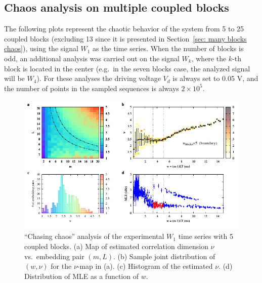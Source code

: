 \begin{appendices}
\chapter{Chaos analysis on multiple coupled blocks}\label{app: multiple blocks}

The following plots represent the chaotic behavior of the system from 5 to 25 coupled blocks
(excluding 13 since it is presented in Section~\ref{sec: many blocks chaos}),
using the signal $W_1$ as the time series.
When the number of blocks is odd, an additional analysis was carried out on the signal $W_k$, where
the $k$-th block is located in the center (e.g.\ in the seven blocks case,
the analyzed signal will be $W_4$).
For these analyses the driving voltage $V_d$ is always set to 0.05 V, and the number of points
in the sampled sequences is always $2\times 10^5$.

\begin{figure}[!htbp]
    \centering
    \includegraphics[width=\linewidth]{../blocks/5_blocks/edge/2e5_points/plots/chaos_low.pdf}
    \caption{``Chasing chaos'' analysis of the experimental $W_1$ time series with 5 coupled blocks.
    (a) Map of estimated correlation dimension $\nu$ vs.\ embedding pair $(m, L)$.
    (b) Sample joint distribution of $(w,\nu)$ for the $\nu$-map in (a).
    (c) Histogram of the estimated $\nu$. (d) Distribution of MLE as a function of $w$.
    } 
\end{figure}


\end{appendices}
